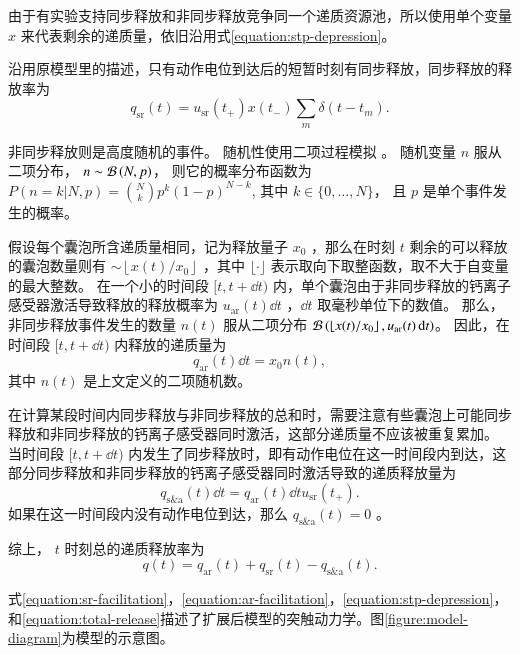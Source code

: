 由于有实验支持同步释放和非同步释放竞争同一个递质资源池\cite{Otsu2004,Wen2010}，所以使用单个变量 $x$ 来代表剩余的递质量，依旧沿用式\ref{equation:stp-depression}。

沿用原模型里的描述，只有动作电位到达后的短暂时刻有同步释放，同步释放的释放率为
\begin{equation}
q_\text{sr}(t) = u_\text{sr}(t_+)x(t_-)\sum_m \delta(t-t_m). \label{equation:sr-release}
\end{equation}

非同步释放则是高度随机的事件。
随机性使用二项过程模拟 \cite{DELCASTILLO1954}。
随机变量 $n$ 服从二项分布， $n\sim{\cal{B}}\left(N,p\right)$， 则它的概率分布函数为 $P(n=k|N,p) = \binom{N}{k} p^k (1-p)^{N-k}$, 其中 $k\in\{0,\ldots,N\}$， 且 $p$ 是单个事件发生的概率。

假设每个囊泡所含递质量相同，记为释放量子 $x_0$ ，那么在时刻 $t$ 剩余的可以释放的囊泡数量则有 $\sim \left\lfloor x(t)/x_0 \right\rfloor$ ，其中 $\lfloor \cdot \rfloor$ 表示取向下取整函数，取不大于自变量的最大整数。
在一个小的时间段 $[t,t+\dd{t})$ 内，单个囊泡由于非同步释放的钙离子感受器激活导致释放的释放概率为 $u_\text{ar}(t)\dd{t}$ ，$\dd{t}$ 取毫秒单位下的数值。
那么，非同步释放事件发生的数量 $n(t)$ 服从二项分布 ${\cal{B}}\left(\left\lfloor x(t)/x_0\right\rfloor,u_\text{ar}(t)\,\mathrm{d}{t}\right)$。
因此，在时间段 $[t,t+\dd{t})$ 内释放的递质量为
\begin{equation}
  q_\text{ar}(t)\dd{t} = x_0 n(t), \label{equation:ar-release}
\end{equation}
其中 $n(t)$ 是上文定义的二项随机数。

在计算某段时间内同步释放与非同步释放的总和时，需要注意有些囊泡上可能同步释放和非同步释放的钙离子感受器同时激活，这部分递质量不应该被重复累加。
当时间段 $[t,t+\dd{t})$ 内发生了同步释放时，即有动作电位在这一时间段内到达，这部分同步释放和非同步释放的钙离子感受器同时激活导致的递质释放量为
\begin{equation}
q_\text{s\&a}(t)\dd{t} = q_\text{ar}(t)\dd{t}u_\text{sr}(t_+).
\end{equation}
如果在这一时间段内没有动作电位到达，那么 $q_\text{s\&a}(t) = 0$ 。

综上， $t$ 时刻总的递质释放率为
\begin{equation}
q(t) = q_\text{ar}(t) +q_\text{sr}(t) - q_\text{s\&a}(t). \label{equation:total-release}
\end{equation}

式\ref{equation:sr-facilitation}，\ref{equation:ar-facilitation}，\ref{equation:stp-depression}，和\ref{equation:total-release}描述了扩展后模型的突触动力学。图\ref{figure:model-diagram}为模型的示意图。

